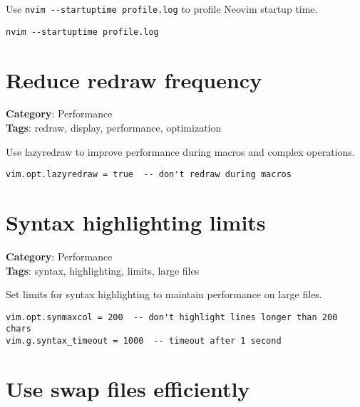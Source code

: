 {{{{{{{{{{Use {\footnotesize \Verb§nvim --startuptime profile.log§} to profile Neovim startup time.

\begin{Exa*}{}
\begin{Verbatim}[fontsize=\footnotesize, breaklines, breakanywhere]
nvim --startuptime profile.log
\end{Verbatim}
\end{Exa*}

\section{Reduce redraw frequency}

\textbf{Category}: Performance\\ \textbf{Tags}: redraw, display, performance, optimization
\vspace{0.5cm}

Use lazyredraw to improve performance during macros and complex operations.

\begin{Exa*}{}
\begin{Verbatim}[fontsize=\footnotesize, breaklines, breakanywhere]
vim.opt.lazyredraw = true  -- don't redraw during macros
\end{Verbatim}
\end{Exa*}

\section{Syntax highlighting limits}

\textbf{Category}: Performance\\ \textbf{Tags}: syntax, highlighting, limits, large files
\vspace{0.5cm}

Set limits for syntax highlighting to maintain performance on large files.

\begin{Exa*}{}
\begin{Verbatim}[fontsize=\footnotesize, breaklines, breakanywhere]
vim.opt.synmaxcol = 200  -- don't highlight lines longer than 200 chars
vim.g.syntax_timeout = 1000  -- timeout after 1 second
\end{Verbatim}
\end{Exa*}

\section{Use swap files efficiently}

}}}}}}}}}}
